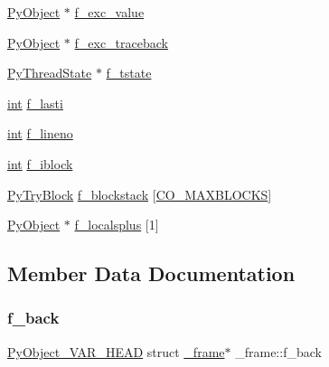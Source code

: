 \begin{DoxyCompactItemize}
\item 
\mbox{\hyperlink{_python27_2object_8h_aadc84ac7aed2cfa6f20c25f62bf3dac7}{Py\+Object}} $\ast$ \mbox{\hyperlink{struct__frame_a570b7add80d01e5421f2c52e413933dd}{f\+\_\+exc\+\_\+value}}
\item 
\mbox{\hyperlink{_python27_2object_8h_aadc84ac7aed2cfa6f20c25f62bf3dac7}{Py\+Object}} $\ast$ \mbox{\hyperlink{struct__frame_ac1ad471552c27336a9c6f35a43a738bb}{f\+\_\+exc\+\_\+traceback}}
\item 
\mbox{\hyperlink{pystate_8h_abd09a2e80e53ee363c70921fca241bfd}{Py\+Thread\+State}} $\ast$ \mbox{\hyperlink{struct__frame_a4c9499c26fd50d6544056697e05ce4d7}{f\+\_\+tstate}}
\item 
\mbox{\hyperlink{warnings_8h_a74f207b5aa4ba51c3a2ad59b219a423b}{int}} \mbox{\hyperlink{struct__frame_aaebc36353db847803b7572b0b6868ccf}{f\+\_\+lasti}}
\item 
\mbox{\hyperlink{warnings_8h_a74f207b5aa4ba51c3a2ad59b219a423b}{int}} \mbox{\hyperlink{struct__frame_a584b2ea31653920d828df650b8223d11}{f\+\_\+lineno}}
\item 
\mbox{\hyperlink{warnings_8h_a74f207b5aa4ba51c3a2ad59b219a423b}{int}} \mbox{\hyperlink{struct__frame_a904da381a4a19f881f68d522fb8d9811}{f\+\_\+iblock}}
\item 
\mbox{\hyperlink{struct_py_try_block}{Py\+Try\+Block}} \mbox{\hyperlink{struct__frame_a7bb5b52ff4d50835f67738158d7d9a02}{f\+\_\+blockstack}} \mbox{[}\mbox{\hyperlink{code_8h_a3667103ec7f96a81ef3d4529d3cd0f88}{C\+O\+\_\+\+M\+A\+X\+B\+L\+O\+C\+KS}}\mbox{]}
\item 
\mbox{\hyperlink{_python27_2object_8h_aadc84ac7aed2cfa6f20c25f62bf3dac7}{Py\+Object}} $\ast$ \mbox{\hyperlink{struct__frame_a0c11cca41571107e3c56771eb385a146}{f\+\_\+localsplus}} \mbox{[}1\mbox{]}
\end{DoxyCompactItemize}


\subsection{Member Data Documentation}
\mbox{\label{struct__frame_a92f0794bfa51e632b26c92e197051051}} 
\subsubsection{\texorpdfstring{f\_back}{f\_back}}
{\footnotesize\ttfamily \mbox{\hyperlink{_python27_2object_8h_aa0eba161a76be8710b3de325c2e7f9e2}{Py\+Object\+\_\+\+V\+A\+R\+\_\+\+H\+E\+AD}} struct \mbox{\hyperlink{struct__frame}{\+\_\+frame}}$\ast$ \+\_\+frame\+::f\+\_\+back}

